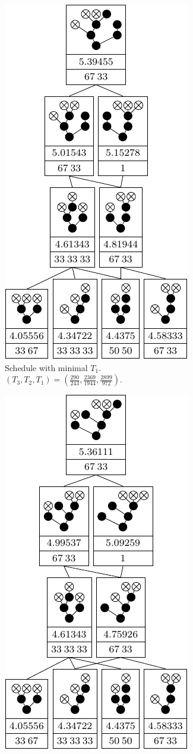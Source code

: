 \begin{figure}[ht]
\begin{subfigure}{.3\linewidth}
    \includegraphics{p3/max_p3_min_p1/00112333t1min.pdf}
    \caption{Schedule with minimal $T_1$. $(T_3,T_2,T_1)=(\frac{290}{243},\frac{2369}{1944},\frac{2899}{972})$.}
  \end{subfigure}
  \quad
  \begin{subfigure}{.3\linewidth}
    \centering
    \includegraphics{p3/max_p3_min_p1/00112333t3max.pdf}

\end{subfigure}
\end{figure}
